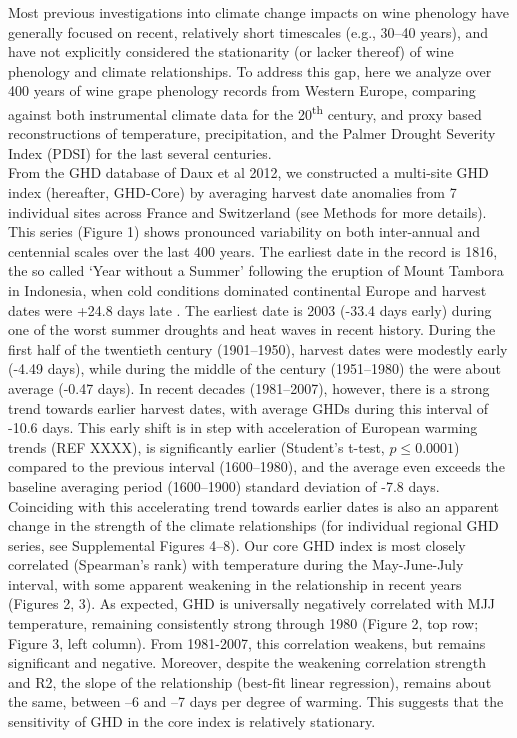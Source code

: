 \documentclass{nature}
\begin{document}
\indent Most previous investigations into climate change impacts on wine phenology have generally focused on recent, relatively short timescales (e.g., 30--40 years\cite{Duchene:2005bd,tomasi2011,webb2012}), and have not explicitly considered the stationarity (or lacker thereof) of wine phenology and climate relationships. To address this gap, here we analyze over 400 years of wine grape phenology records from Western Europe\cite{Daux2012}, comparing against both instrumental climate data for the 20\textsuperscript{th} century, and proxy based reconstructions of temperature\cite{Luterbacher2004}, precipitation\cite{Pauling2006}, and the Palmer Drought Severity Index\cite{CookOWDA2015} (PDSI) for the last several centuries.\\
\indent From the GHD database of Daux et al 2012, we constructed a multi-site GHD index (hereafter, GHD-Core) by averaging harvest date anomalies from 7 individual sites across France and Switzerland (see Methods for more details). This series (Figure 1) shows pronounced variability on both inter-annual and centennial scales over the last 400 years. The earliest date in the record is 1816, the so called `Year without a Summer' following the eruption of Mount Tambora in Indonesia\cite{Oppenheimer2003}, when cold conditions dominated continental Europe and harvest dates were +24.8 days late . The earliest date is 2003 (-33.4 days early) during one of the worst summer droughts and heat waves in recent history\cite{Rebetz2006}. During the first half of the twentieth century (1901--1950), harvest dates were modestly early (-4.49 days), while during the middle of the century (1951--1980) the were about average (-0.47 days). In recent decades (1981--2007), however, there is a strong trend towards earlier harvest dates, with average GHDs during this interval of -10.6 days. This early shift is in step with acceleration of European warming trends (REF XXXX), is significantly earlier (Student's t-test, $p\le0.0001$) compared to the previous interval (1600--1980), and the average even exceeds the baseline averaging period (1600--1900) standard deviation of -7.8 days.\\
\indent Coinciding with this accelerating trend towards earlier dates is also an apparent change in the strength of the climate relationships (for individual regional GHD series, see Supplemental Figures 4--8). Our core GHD index is most closely correlated (Spearman's rank) with temperature during the May-June-July interval, with some apparent weakening in the relationship in recent years (Figures 2, 3). As expected, GHD is universally negatively correlated with MJJ temperature, remaining consistently strong through 1980 (Figure 2, top row; Figure 3, left column). From 1981-2007, this correlation weakens, but remains significant and negative. Moreover, despite the weakening correlation strength and R2, the slope of the relationship (best-fit linear regression), remains about the same, between --6 and --7 days per degree of warming. This suggests that the sensitivity of GHD in the core index is relatively stationary.\\
\end{document}
